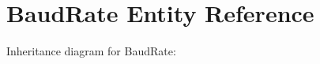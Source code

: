 \hypertarget{class_baud_rate}{}\section{Baud\+Rate Entity Reference}
\label{class_baud_rate}


Inheritance diagram for Baud\+Rate\+:
